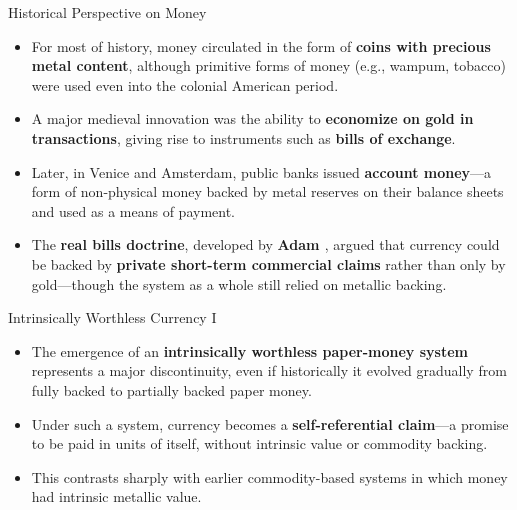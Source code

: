 \documentclass[11pt,aspectratio=169]{beamer}
\begin{document}
\begin{frame}{Historical Perspective on Money}
\small
\begin{itemize}

    \item For most of history, money circulated in the form of \textbf{coins with precious metal content}, although primitive forms of money (e.g., wampum, tobacco) were used even into the colonial American period.

    \vspace{0.8em}

    \item A major medieval innovation was the ability to \textbf{economize on gold in transactions}, giving rise to instruments such as \textbf{bills of exchange}.

    \vspace{0.8em}

    \item Later, in Venice and Amsterdam, public banks issued \textbf{account money}—a form of non-physical money backed by metal reserves on their balance sheets and used as a means of payment.

    \vspace{0.8em}

    \item The \textbf{real bills doctrine}, developed by \textbf{Adam \textcite{smith1776wealth}}, argued that currency could be backed by \textbf{private short-term commercial claims} rather than only by gold—though the system as a whole still relied on metallic backing.
    
\end{itemize}
\end{frame}
\begin{frame}{Intrinsically Worthless Currency I}
\small
\begin{itemize}

    \item The emergence of an \textbf{intrinsically worthless paper-money system} represents a major discontinuity, even if historically it evolved gradually from fully backed to partially backed paper money.

    \vspace{0.7em}

    \item Under such a system, currency becomes a \textbf{self-referential claim}—a promise to be paid in units of itself, without intrinsic value or commodity backing.

    \vspace{0.7em}

    \item This contrasts sharply with earlier commodity-based systems in which money had intrinsic metallic value.

\end{itemize}
\end{frame}
\end{document}
